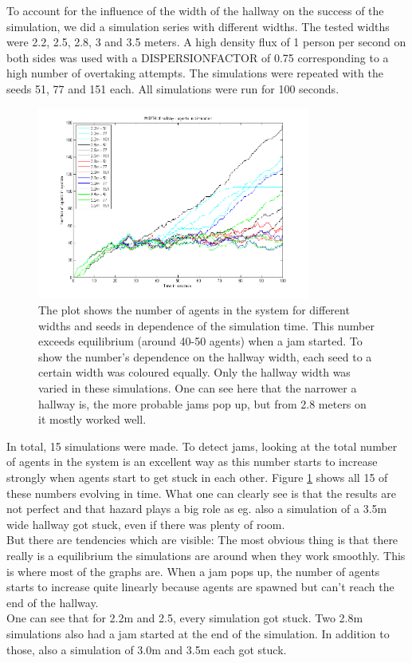 
\noi To account for the influence of the width of the hallway on the success of the simulation, we did a simulation series with different widths. The tested widths were 2.2, 2.5, 2.8, 3 and 3.5 meters. A high density flux of 1 person per second on both sides was used with a DISPERSIONFACTOR of 0.75 corresponding to a high number of overtaking attempts. The simulations were repeated with the seeds 51, 77 and 151 each. All simulations were run for 100 seconds.\\

\begin{figure}[h!]
	\centering
		\includegraphics[width=0.80\textwidth]{../../code/sim/Width/AallInOne.png}
	\caption{The plot shows the number of agents in the system for different widths and seeds in dependence of the simulation time. This number exceeds equilibrium (around 40-50 agents) when a jam started. To show the number's dependence on the hallway width, each seed to a certain width was coloured equally. Only the hallway width was varied in these simulations. One can see here that the narrower a hallway is, the more probable jams pop up, but from 2.8 meters on it mostly worked well.}
	\label{fig:WidthAllInOne}
\end{figure}

\noi In total, 15 simulations were made. To detect jams, looking at the total number of agents in the system is an excellent way as this number starts to increase strongly when agents start to get stuck in each other. Figure \ref{fig:WidthAllInOne} shows all 15 of these numbers evolving in time. What one can clearly see is that the results are not perfect and that hazard plays a big role as eg. also a simulation of a 3.5m wide hallway got stuck, even if there was plenty of room.\\
But there are tendencies which are visible: The most obvious thing is that there really is a equilibrium the simulations are around when they work smoothly. This is where most of the graphs are. When a jam pops up, the number of agents starts to increase quite linearly because agents are spawned but can't reach the end of the hallway.\\
One can see that for 2.2m and 2.5, every simulation got stuck. Two 2.8m simulations also had a jam started at the end of the simulation. In addition to those, also a simulation of 3.0m and 3.5m each got stuck.\\

